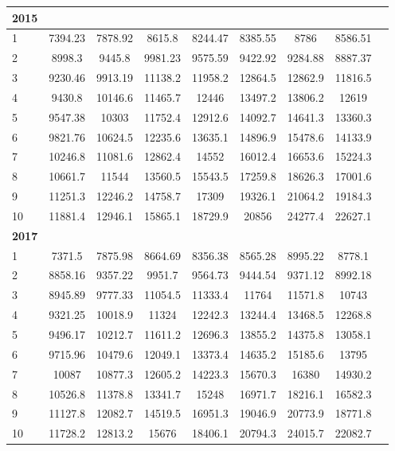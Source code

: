 \documentclass[jimaging,article,submit,pdftex,moreauthors]{Definitions/mdpi}
\begin{document}
\begin{longtable}{@{\extracolsep{\fill}}p{1.5cm}cccccccc@{}}
\bf{2015} &  &  &  &  &  &  & \\
\hline
1 & 7394.23 & 7878.92 & 8615.8 & 8244.47 & 8385.55 & 8786 & 8586.51 \\
2 & 8998.3 & 9445.8 & 9981.23 & 9575.59 & 9422.92 & 9284.88 & 8887.37 \\
3 & 9230.46 & 9913.19 & 11138.2 & 11958.2 & 12864.5 & 12862.9 & 11816.5 \\
4 & 9430.8 & 10146.6 & 11465.7 & 12446 & 13497.2 & 13806.2 & 12619 \\
5 & 9547.38 & 10303 & 11752.4 & 12912.6 & 14092.7 & 14641.3 & 13360.3 \\
6 & 9821.76 & 10624.5 & 12235.6 & 13635.1 & 14896.9 & 15478.6 & 14133.9 \\
7 & 10246.8 & 11081.6 & 12862.4 & 14552 & 16012.4 & 16653.6 & 15224.3 \\
8 & 10661.7 & 11544 & 13560.5 & 15543.5 & 17259.8 & 18626.3 & 17001.6 \\
9 & 11251.3 & 12246.2 & 14758.7 & 17309 & 19326.1 & 21064.2 & 19184.3 \\
10 & 11881.4 & 12946.1 & 15865.1 & 18729.9 & 20856 & 24277.4 & 22627.1 \\
\hline
\bf{2017} &  &  &  & & & & \\
\hline
1 & 7371.5 & 7875.98 & 8664.69 & 8356.38 & 8565.28 & 8995.22 & 8778.1 \\
2 & 8858.16 & 9357.22 & 9951.7 & 9564.73 & 9444.54 & 9371.12 & 8992.18 \\
3 & 8945.89 & 9777.33 & 11054.5 & 11333.4 & 11764 & 11571.8 & 10743 \\
4 & 9321.25 & 10018.9 & 11324 & 12242.3 & 13244.4 & 13468.5 & 12268.8 \\
5 & 9496.17 & 10212.7 & 11611.2 & 12696.3 & 13855.2 & 14375.8 & 13058.1 \\
6 & 9715.96 & 10479.6 & 12049.1 & 13373.4 & 14635.2 & 15185.6 & 13795 \\
7 & 10087 & 10877.3 & 12605.2 & 14223.3 & 15670.3 & 16380 & 14930.2 \\
8 & 10526.8 & 11378.8 & 13341.7 & 15248 & 16971.7 & 18216.1 & 16582.3 \\
9 & 11127.8 & 12082.7 & 14519.5 & 16951.3 & 19046.9 & 20773.9 & 18771.8 \\
10 & 11728.2 & 12813.2 & 15676 & 18406.1 & 20794.3 & 24015.7 & 22082.7 \\
\hline


\end{longtable}
\end{document}
